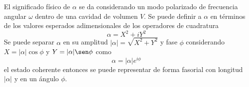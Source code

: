 El significado físico de $\alpha$ se da considerando un modo polarizado de frecuencia angular $\omega$ dentro de una cavidad de volumen $V$. Se puede definir a $\alpha$ en términos de los valores esperados adimensionales de los operadores de cuadratura
\begin{equation*}
  \alpha = X^2 + iY^2
\end{equation*}
Se puede separar $\alpha$ en su amplitud $|\alpha|=\sqrt{X^2 + Y^2}$ y fase $\phi$ considerando $X = |\alpha|\cos\phi$ y $Y=|\alpha|\sen\phi$ como
\begin{equation*}
  \alpha = |\alpha|e^{i\phi}
\end{equation*}
el estado coherente entonces se puede representar de forma fasorial con longitud $|\alpha|$ y en un ángulo $\phi$.


\begin{figure}[!h]
  \centering

  \begin{tikzpicture}[x=0.75pt,y=0.75pt,yscale=-1,xscale=1]


\end{tikzpicture}
\end{figure}
